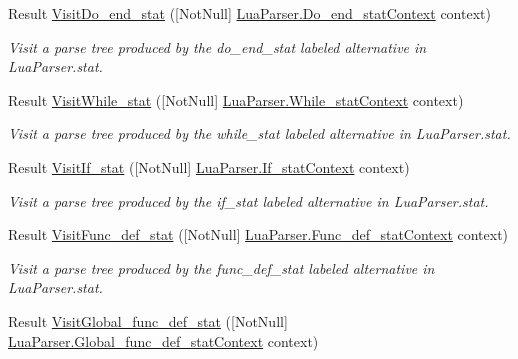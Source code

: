 \begin{DoxyCompactItemize}
Result \mbox{\hyperlink{interfacezlua_1_1_i_lua_visitor_a0bffd1ec59b6a27546f19006974cd6c1}{Visit\+Do\+\_\+end\+\_\+stat}} (\mbox{[}Not\+Null\mbox{]} \mbox{\hyperlink{classzlua_1_1_lua_parser_1_1_do__end__stat_context}{Lua\+Parser.\+Do\+\_\+end\+\_\+stat\+Context}} context)
\begin{DoxyCompactList}\small\item\em Visit a parse tree produced by the {\ttfamily do\+\_\+end\+\_\+stat} labeled alternative in Lua\+Parser.\+stat. \end{DoxyCompactList}\item 
Result \mbox{\hyperlink{interfacezlua_1_1_i_lua_visitor_a89838dbcf062f4b3adaf75df89febc8d}{Visit\+While\+\_\+stat}} (\mbox{[}Not\+Null\mbox{]} \mbox{\hyperlink{classzlua_1_1_lua_parser_1_1_while__stat_context}{Lua\+Parser.\+While\+\_\+stat\+Context}} context)
\begin{DoxyCompactList}\small\item\em Visit a parse tree produced by the {\ttfamily while\+\_\+stat} labeled alternative in Lua\+Parser.\+stat. \end{DoxyCompactList}\item 
Result \mbox{\hyperlink{interfacezlua_1_1_i_lua_visitor_a67ff0fb78fe2f6c915b5f218f57323b3}{Visit\+If\+\_\+stat}} (\mbox{[}Not\+Null\mbox{]} \mbox{\hyperlink{classzlua_1_1_lua_parser_1_1_if__stat_context}{Lua\+Parser.\+If\+\_\+stat\+Context}} context)
\begin{DoxyCompactList}\small\item\em Visit a parse tree produced by the {\ttfamily if\+\_\+stat} labeled alternative in Lua\+Parser.\+stat. \end{DoxyCompactList}\item 
Result \mbox{\hyperlink{interfacezlua_1_1_i_lua_visitor_a784e05c705956dc10a1df269f7efbb3c}{Visit\+Func\+\_\+def\+\_\+stat}} (\mbox{[}Not\+Null\mbox{]} \mbox{\hyperlink{classzlua_1_1_lua_parser_1_1_func__def__stat_context}{Lua\+Parser.\+Func\+\_\+def\+\_\+stat\+Context}} context)
\begin{DoxyCompactList}\small\item\em Visit a parse tree produced by the {\ttfamily func\+\_\+def\+\_\+stat} labeled alternative in Lua\+Parser.\+stat. \end{DoxyCompactList}\item 
Result \mbox{\hyperlink{interfacezlua_1_1_i_lua_visitor_a866d0dc7a283123ec21f9f279f7f647a}{Visit\+Global\+\_\+func\+\_\+def\+\_\+stat}} (\mbox{[}Not\+Null\mbox{]} \mbox{\hyperlink{classzlua_1_1_lua_parser_1_1_global__func__def__stat_context}{Lua\+Parser.\+Global\+\_\+func\+\_\+def\+\_\+stat\+Context}} context)

\end{DoxyCompactItemize}
